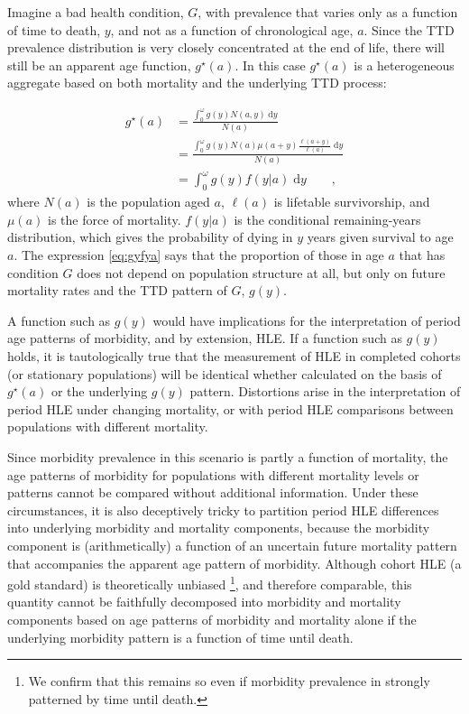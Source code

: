 \documentclass[12pt,oneside,a4paper]{article} %
\newcommand{\dd}{\; \mathrm{d}}
\newcommand{\tc}{\quad\quad\text{,}}
\begin{document}
 \FloatBarrier
 
Imagine a bad health condition, $G$, with prevalence that varies only as a
function of time to death, $y$, and not as a function of chronological age, $a$.
Since the TTD prevalence distribution is very closely concentrated at the end of life, there will still be an apparent age function,
$g^\star(a)$.
In this case $g^\star(a)$ is a heterogeneous aggregate based on both mortality
and the underlying TTD process:
 
\begin{align}
g^\star(a) &= \frac{\int _0^\omega g(y) N(a,y) \dd y}{N(a)} \\
      &= \frac{\int _0^\omega g(y) N(a)
      \mu(a+y)\frac{\ell(a+y)}{\ell(a)}\dd y}{N(a)}\\
      &= \int _0^\omega g(y) f(y|a)\dd y \label{eq:gyfya}\tc
\end{align}
where $N(a)$ is the population aged $a$, $\ell(a)$ is lifetable survivorship, and
$\mu(a)$ is the force of mortality. $f(y|a)$ is the conditional remaining-years
distribution, which gives the probability of dying in $y$ years given survival
to age $a$. The expression \eqref{eq:gyfya} says that the proportion of those in
age $a$ that has condition $G$ does not depend on population structure at all, but only on future mortality rates and the TTD pattern of $G$, $g(y)$. 

A function such as $g(y)$ would have implications for the interpretation of
period age patterns of morbidity, and by extension, HLE. If a function such as $g(y)$ holds, it is tautologically true that the
measurement of HLE in completed cohorts (or stationary populations)
will be identical whether calculated on the basis of $g^\star(a)$ or the
underlying $g(y)$ pattern. Distortions arise in the interpretation of
period HLE under changing mortality, or with period HLE comparisons between
populations with different mortality. 


Since morbidity prevalence in this scenario is partly a function of mortality,
 the age patterns of morbidity for populations with different mortality
levels or patterns cannot be compared without additional information. Under
these circumstances, it is also deceptively tricky to partition period HLE
differences into underlying morbidity and mortality components, because the
morbidity component is (arithmetically) a function of an uncertain future mortality pattern
that accompanies the apparent age pattern of morbidity. Although cohort HLE (a
gold standard) is theoretically unbiased \citep{imai2007estimation}\footnote{We confirm that this remains so even if morbidity prevalence in strongly patterned by time until death.}, and therefore comparable, this quantity cannot be faithfully
decomposed into morbidity and mortality components based on age patterns of morbidity and mortality alone if
the underlying morbidity pattern is a function of time until death.
\end{document}
